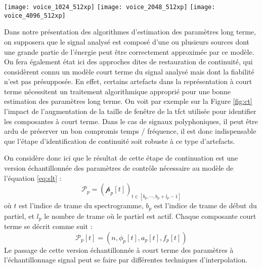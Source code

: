 \begin{figure*}[t]
  \texttt{[image: voice\_1024\_512xp]}
  \texttt{[image: voice\_2048\_512xp]}
  \texttt{[image: voice\_4096\_512xp]}
  \caption{Influence de la taille de fenêtre de la tfct utilisée pour estimer un modèle sinusoïdal à court terme. De gauche à droite, la taille est de 25, 50, et 100 ms, pour un pas d'avancement de 10 ms. Chaque point correspond  à une composante à court terme $p_{t, c}$ et sa taille est fonction de l'amplitude de la composante $a_{t, c}$.}
  \label{fig:ct}
\end{figure*}

Dans notre présentation des algorithmes d'estimation des paramètres long terme, on supposera que le signal analysé est composé d'une ou plusieurs sources dont une grande partie de l'énergie peut être correctement approximée par ce modèle. On fera également état ici des approches dites de \og restauration \fg de continuité, qui considèrent connu un modèle court terme du signal analysé mais dont la fiabilité n'est pas présupposée. En effet, certains artefacts dans la représentation à court terme nécessitent un traitement algorithmique approprié pour une bonne estimation des paramètres long terme. On voit par exemple sur la Figure \ref{fig:ct} l'impact de l'augmentation de la taille de fenêtre de la tfct utilisée pour identifier les composantes à court terme. Dans le cas de signaux polyphoniques, il peut être ardu de préserver un bon compromis temps / fréquence, il est donc indispensable que l'étape d'identification de continuité soit robuste à ce type d'artefacts.


On considère donc ici que le résultat de cette étape de continuation est une version échantillonnée des paramètres de contrôle nécessaire au modèle de l'équation \ref{eq:slt} :
\begin{equation}
\mathcal{P}_{p}=\left(\mathcal{p}_{p}[t]\right)_{t \in\left[b_{p}, \cdots, b_{p}+l_{p}-1\right]}
\end{equation}
où $t$ est l'indice de trame du spectrogramme, $b_{p}$ est l'indice de trame de début du partiel, et $l_{p}$ le nombre de trame où le partiel est actif. Chaque composante court terme se décrit comme suit :
\begin{equation}
\mathcal{P}_{p}[t]=\left(n, \phi_{p}[t], a_{p}[t], f_{p}[t]\right)
\end{equation}
Le passage de cette version échantillonnée à court terme des paramètres à l'échantillonnage signal peut se faire par différentes techniques d'interpolation.

